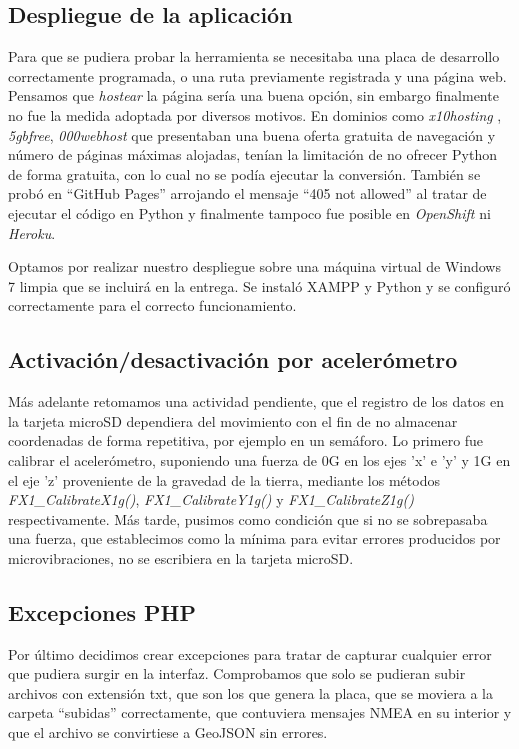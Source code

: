 \subsection{Despliegue de la aplicación}
Para que se pudiera probar la herramienta se necesitaba una placa de desarrollo correctamente programada, o una ruta previamente registrada y una página web. Pensamos que \textit{hostear} la página sería una buena opción, sin embargo finalmente no fue la medida adoptada por diversos motivos. En dominios como \textit{x10hosting} , \textit{5gbfree}, \textit{000webhost} que presentaban una buena oferta gratuita de navegación y número de páginas máximas alojadas, tenían la limitación de no ofrecer Python de forma gratuita, con lo cual no se podía ejecutar la conversión. También se probó en ``GitHub Pages'' arrojando el mensaje ``405 not allowed'' al tratar de ejecutar el código en Python y finalmente tampoco fue posible en \textit{OpenShift} ni \textit{Heroku}. 

Optamos por realizar nuestro despliegue sobre una máquina virtual de Windows 7 limpia que se incluirá en la entrega. Se instaló XAMPP y Python y se configuró correctamente para el correcto funcionamiento.

\subsection{Activación/desactivación por acelerómetro}
Más adelante retomamos una actividad pendiente, que el registro de los datos en la tarjeta microSD dependiera del movimiento con el fin de no almacenar coordenadas de forma repetitiva, por ejemplo en un semáforo. Lo primero fue calibrar el acelerómetro, suponiendo una fuerza de 0G en los ejes 'x' e 'y' y 1G en el eje 'z' proveniente de la gravedad de la tierra, mediante los métodos \textit{FX1\_CalibrateX1g()}, \textit{FX1\_CalibrateY1g()} y \textit{FX1\_CalibrateZ1g()} respectivamente. Más tarde, pusimos como condición que si no se sobrepasaba una fuerza, que establecimos como la mínima para evitar errores producidos por microvibraciones, no se escribiera en la tarjeta microSD.

\subsection{Excepciones PHP}
Por último decidimos crear excepciones para tratar de capturar cualquier error que pudiera surgir en la interfaz. Comprobamos que solo se pudieran subir archivos con extensión txt, que son los que genera la placa, que se moviera a la carpeta ``subidas'' correctamente, que contuviera mensajes NMEA en su interior y que el archivo se convirtiese a GeoJSON sin errores.

